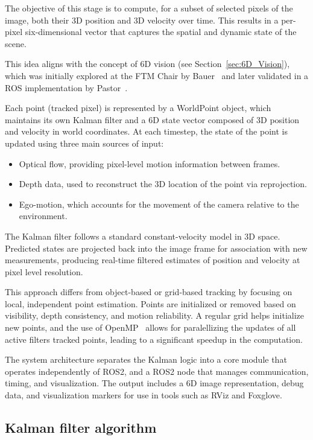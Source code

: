 The objective of this stage is to compute, for a subset of selected pixels of the image, both their 3D position and 3D
velocity over time. This results in a per-pixel six-dimensional vector that captures the spatial and
dynamic state of the scene.

This idea aligns with the concept of 6D vision (see Section~\ref{sec:6D_Vision}),
which was initially explored at the FTM Chair by Bauer~\cite{previous_tfm_bauer} and later validated in a
ROS implementation by Pastor~\cite{previous_tfm_pastor}.

Each point (tracked pixel) is represented by a WorldPoint object, which maintains its own Kalman 
filter and a 6D state vector composed of 3D position and velocity in world coordinates. 
At each timestep, the state of the point is updated using three main sources of input: 

\begin{itemize} 
  \item Optical flow, providing pixel-level motion information between frames. 
  \item Depth data, used to reconstruct the 3D location of the point via reprojection. 
  \item Ego-motion, which accounts for the movement of the camera relative to the environment. 
\end{itemize}


The Kalman filter follows a standard constant-velocity model in 3D space. Predicted states are projected back into 
the image frame for association with new measurements, producing real-time filtered estimates of position and velocity 
at pixel level resolution.

This approach differs from object-based or grid-based tracking by focusing on local, independent point estimation. 
Points are initialized or removed based on visibility, depth consistency, and motion reliability. 
A regular grid helps initialize new points, and the use of OpenMP~\cite{openMP} allows for paralellizing the updates of all active filters
tracked points, leading to a significant speedup in the computation.

The system architecture separates the Kalman logic into a core module that operates independently of ROS2, 
and a ROS2 node that manages communication, timing, and visualization. The output includes a 6D image representation, 
debug data, and visualization markers for use in tools such as RViz and Foxglove. 


\subsection{Kalman filter algorithm}\label{sec:KalmanFilterAlgorithm}

